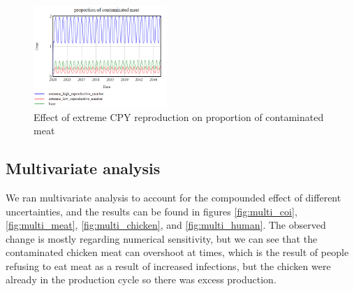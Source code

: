 \begin{figure}[h!]
    \centering
    \includegraphics[width=0.45\textwidth]{images/extremes/CPY_reproduction_contaminated_meat.png} 
    \caption{Effect of extreme CPY reproduction on proportion of contaminated meat}
    \label{fig:reproduction_meat}
\end{figure}



\subsection{Multivariate analysis}

We ran multivariate analysis to account for the compounded effect of different uncertainties, and the results can be found in figures \ref{fig:multi_coi}, \ref{fig:multi_meat}, \ref{fig:multi_chicken}, and \ref{fig:multi_human}. The observed change is mostly regarding numerical sensitivity, but we can see that the contaminated chicken meat can overshoot at times, which is the result of people refusing to eat meat as a result of increased infections, but the chicken were already in the production cycle so there was excess production.


